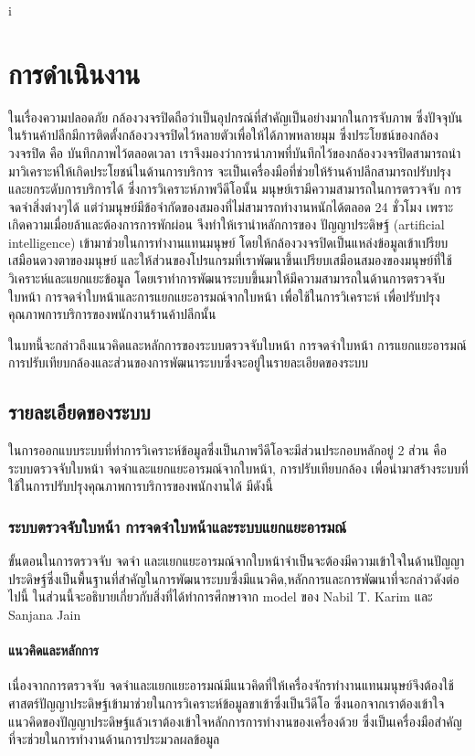 i\chapter{การดำเนินงาน}
\label{method}
ในเรื่องความปลอดภัย กล้องวงจรปิดถือว่าเป็นอุปกรณ์ที่สำคัญเป็นอย่างมากในการจับภาพ ซึ่งปัจจุบันในร้านค้าปลีกมีการติดตั้งกล้องวงจรปิดไว้หลายตัวเพื่อให้ได้ภาพหลายมุม ซึ่งประโยชน์ของกล้องวงจรปิด คือ บันทึกภาพไว้ตลอดเวลา เราจึงมองว่าการนำภาพที่บันทึกไว้ของกล้องวงจรปิดสามารถนำมาวิเคราะห์ให้เกิดประโยชน์ในด้านการบริการ จะเป็นเครื่องมือที่ช่วยให้ร้านค้าปลีกสามารถปรับปรุงและยกระดับการบริการได้ ซึ่งการวิเคราะห์ภาพวีดีโอนั้น มนุษย์เรามีความสามารถในการตรวจจับ การจดจำสิ่งต่างๆได้ แต่ว่ามนุษย์มีข้อจำกัดของสมองที่ไม่สามารถทำงานหนักได้ตลอด 24 ชั่วโมง เพราะเกิดความเมื่อยล้าและต้องการการพักผ่อน จึงทำให้เรานำหลักการของ ปัญญาประดิษฐ์ (artificial intelligence) เข้ามาช่วยในการทำงานแทนมนุษย์ โดยให้กล้องวงจรปิดเป็นแหล่งข้อมูลเข้าเปรียบเสมือนดวงตาของมนุษย์ และให้ส่วนของโปรแกรมที่เราพัฒนาขึ้นเปรียบเสมือนสมองของมนุษย์ที่ใช้วิเคราะห์และแยกแยะข้อมูล โดยเราทำการพัฒนาระบบขึ้นมาให้มีความสามารถในด้านการตรวจจับใบหน้า การจดจำใบหน้าและการแยกแยะอารมณ์จากใบหน้า เพื่อใช้ในการวิเคราะห์ เพื่อปรับปรุงคุณภาพการบริการของพนักงานร้านค้าปลีกนั้น

ในบทนี้จะกล่าวถึงแนวคิดและหลักการของระบบตรวจจับใบหน้า การจดจำใบหน้า การแยกแยะอารมณ์ การปรับเทียบกล้องและส่วนของการพัฒนาระบบซึ่งจะอยู่ในรายละเอียดของระบบ
\section{รายละเอียดของระบบ}
ในการออกแบบระบบที่ทำการวิเคราะห์ข้อมูลซึ่งเป็นภาพวีดีโอจะมีส่วนประกอบหลักอยู่ 2 ส่วน คือ ระบบตรวจจับใบหน้า จดจำและแยกแยะอารมณ์จากใบหน้า, การปรับเทียบกล้อง เพื่อนำมาสร้างระบบที่ใช้ในการปรับปรุงคุณภาพการบริการของพนักงานได้ มีดังนี้
\subsection{ระบบตรวจจับใบหน้า การจดจำใบหน้าและระบบแยกแยะอารมณ์}
ขั้นตอนในการตรวจจับ จดจำ และแยกแยะอารมณ์จากใบหน้าจำเป็นจะต้องมีความเข้าใจในด้านปัญญาประดิษฐ์ซึ่งเป็นพื้นฐานที่สำคัญในการพัฒนาระบบซึ่งมีแนวคิด,หลักการและการพัฒนาที่จะกล่าวดังต่อไปนี้
ในส่วนนี้จะอธิบายเกี่ยวกับสิ่งที่ได้ทำการศึกษาจาก model ของ  Nabil T. Karim \cite{nabil} และ Sanjana Jain \cite{sanjana}
\subsubsection{แนวคิดและหลักการ}
เนื่องจากการตรวจจับ จดจำและแยกแยะอารมณ์มีแนวคิดที่ให้เครื่องจักรทำงานแทนมนุษย์จึงต้องใช้ศาสตร์ปัญญาประดิษฐ์เข้ามาช่วยในการวิเคราะห์ข้อมูลขาเข้าซึ่งเป็นวีดีโอ ซึ่งนอกจากเราต้องเข้าใจแนวคิดของปัญญาประดิษฐ์แล้วเราต้องเข้าใจหลักการการทำงานของเครื่องด้วย ซึ่งเป็นเครื่องมือสำคัญที่จะช่วยในการทำงานด้านการประมวลผลข้อมูล

